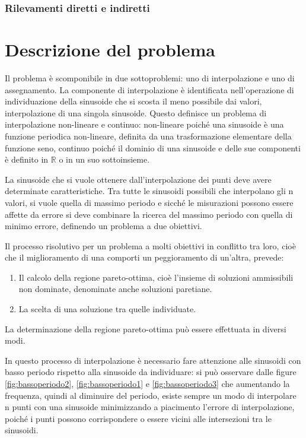 \documentclass[a4paper,12pt]{report}
\begin{document}
\subsection{Rilevamenti diretti e indiretti}

%
%
\chapter{Descrizione del problema}
\label{cap2}
Il problema è scomponibile in due sottoproblemi: uno di interpolazione e uno di assegnamento. La componente di interpolazione è identificata nell'operazione di individuazione della sinusoide che si scosta il meno possibile dai valori, interpolazione di una singola sinusoide. Questo definisce un problema di interpolazione non-lineare e continuo: non-lineare poiché una sinusoide è una funzione periodica non-lineare, definita da una trasformazione elementare della funzione seno, continuo poiché il dominio di una sinusoide e delle sue componenti è definito in $\mathbb{R}$ o in un suo sottoinsieme.

La sinusoide che si vuole ottenere dall'interpolazione dei punti deve avere determinate caratteristiche. Tra tutte le sinusoidi possibili che interpolano gli n valori, si vuole quella di massimo periodo e sicché le misurazioni possono essere affette da errore si deve combinare la ricerca del massimo periodo con quella di minimo errore, definendo un problema a due obiettivi.

Il processo risolutivo per un problema a molti obiettivi in conflitto tra loro, cioè che il miglioramento di una comporti un peggioramento di un'altra, prevede:
\begin{enumerate}
  \item Il calcolo della regione pareto-ottima, cioè l'insieme di soluzioni ammissibili non dominate, denominate anche soluzioni paretiane.
  \item La scelta di una soluzione tra quelle individuate.
\end{enumerate}
La determinazione della regione pareto-ottima può essere effettuata in diversi modi.

In questo processo di interpolazione è necessario fare attenzione alle sinusoidi con basso periodo rispetto alla sinusoide da individuare: si può osservare dalle figure \ref{fig:bassoperiodo2}, \ref{fig:bassoperiodo1} e \ref{fig:bassoperiodo3} che aumentando la frequenza, quindi al diminuire del periodo, esiste sempre un modo di interpolare n punti con una sinusoide minimizzando a piacimento l'errore di interpolazione, poiché i punti possono corrispondere o essere vicini alle intersezioni tra le sinusoidi.
\end{document}
